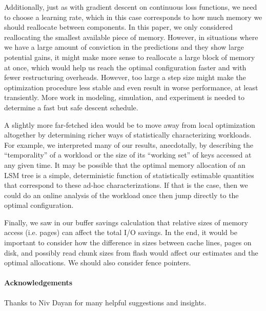 \documentclass{sig-alternate-05-2015}
\begin{document}
Additionally, just as with gradient descent on continuous loss functions, we
need to choose a learning rate, which in this case corresponds to how much
memory we should reallocate between components. In this paper, we only
considered reallocating the smallest available piece of memory. However, in
situations where we have a large amount of conviction in the predictions and
they show large potential gains, it might make more sense to reallocate a large
block of memory at once, which would help us reach the optimal configuration
faster and with fewer restructuring overheads. However, too large a step size
might make the optimization procedure less stable and even result in worse
performance, at least transiently. More work in modeling, simulation, and
experiment is needed to determine a fast but safe descent schedule.

A slightly more far-fetched idea would be to move away from local optimization
altogether by determining richer ways of statistically characterizing
workloads.  For example, we interpreted many of our results, anecdotally, by
describing the ``temporality'' of a workload or the size of its ``working set''
of keys accessed at any given time. It may be possible that the optimal memory
allocation of an LSM tree is a simple, deterministic function of statistically
estimable quantities that correspond to these ad-hoc characterizations. If that
is the case, then we could do an online analysis of the workload once then jump
directly to the optimal configuration.

Finally, we saw in our buffer savings calculation that relative sizes of memory
access (i.e. pages) can affect the total I/O savings. In the end, it would be
important to consider how the difference in sizes between cache lines, pages on
disk, and possibly read chunk sizes from flash would affect our estimates and
the optimal allocations. We should also consider fence pointers.

\paragraph{Acknowledgements}
Thanks to Niv Dayan for many helpful suggestions and insights.

\vfill\eject



\end{document}
